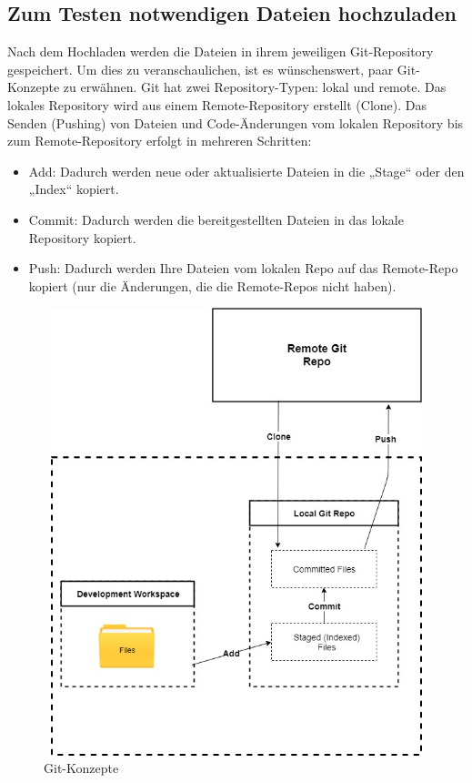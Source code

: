 \documentclass[a4paper,12pt,oneside]{book}
\begin{document}
\subsection{Zum Testen notwendigen Dateien hochzuladen}
Nach dem Hochladen werden die Dateien in ihrem jeweiligen Git-Repository gespeichert. Um dies zu veranschaulichen, ist es wünschenswert, paar Git-Konzepte zu erwähnen.
\newline
Git hat zwei Repository-Typen: lokal und remote. Das lokales Repository wird aus einem Remote-Repository erstellt (Clone). Das Senden (Pushing) von Dateien und Code-Änderungen vom lokalen Repository bis zum Remote-Repository erfolgt in mehreren Schritten: 
\begin{itemize}
	\item Add: Dadurch werden neue oder aktualisierte Dateien in die „Stage“ oder den „Index“ kopiert.
	\item Commit: Dadurch werden die bereitgestellten Dateien in das lokale Repository kopiert.
	\item Push: Dadurch werden Ihre Dateien vom lokalen Repo auf das Remote-Repo kopiert (nur die Änderungen, die die Remote-Repos nicht haben).
\end{itemize}
\begin{figure}[h!]
	\begin{center}
		\includegraphics[width=12cm, height=13cm]{Git-Konzept.jpg}
		\caption{Git-Konzepte} 
		\label{ Git-Konzepte} 
	\end{center}
\end{figure}
\end{document}

